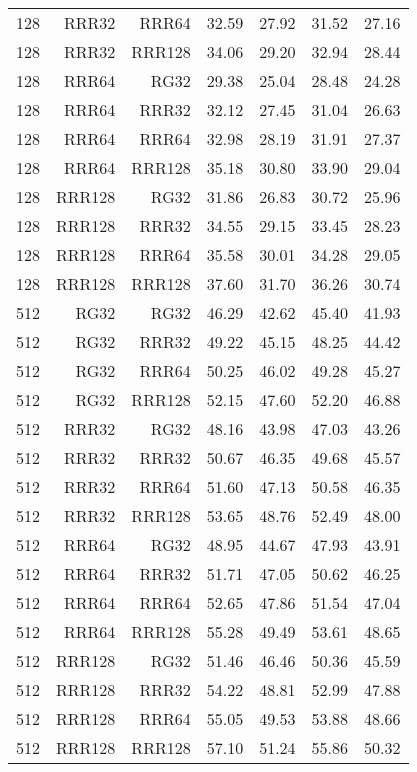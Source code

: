 \begin{table}
\begin{tabular}{|r|r|r|r|r|r|r|}
128 & RRR32 & RRR64 & 32.59 & 27.92 & 31.52 & 27.16 \\
128 & RRR32 & RRR128 & 34.06 & 29.20 & 32.94 & 28.44 \\
128 & RRR64 & RG32 & 29.38 & 25.04 & 28.48 & 24.28 \\
128 & RRR64 & RRR32 & 32.12 & 27.45 & 31.04 & 26.63 \\
128 & RRR64 & RRR64 & 32.98 & 28.19 & 31.91 & 27.37 \\
128 & RRR64 & RRR128 & 35.18 & 30.80 & 33.90 & 29.04 \\
128 & RRR128 & RG32 & 31.86 & 26.83 & 30.72 & 25.96 \\
128 & RRR128 & RRR32 & 34.55 & 29.15 & 33.45 & 28.23 \\
128 & RRR128 & RRR64 & 35.58 & 30.01 & 34.28 & 29.05 \\
128 & RRR128 & RRR128 & 37.60 & 31.70 & 36.26 & 30.74 \\
512 & RG32 & RG32 & 46.29 & 42.62 & 45.40 & 41.93 \\
512 & RG32 & RRR32 & 49.22 & 45.15 & 48.25 & 44.42 \\
512 & RG32 & RRR64 & 50.25 & 46.02 & 49.28 & 45.27 \\
512 & RG32 & RRR128 & 52.15 & 47.60 & 52.20 & 46.88 \\
512 & RRR32 & RG32 & 48.16 & 43.98 & 47.03 & 43.26 \\
512 & RRR32 & RRR32 & 50.67 & 46.35 & 49.68 & 45.57 \\
512 & RRR32 & RRR64 & 51.60 & 47.13 & 50.58 & 46.35 \\
512 & RRR32 & RRR128 & 53.65 & 48.76 & 52.49 & 48.00 \\
512 & RRR64 & RG32 & 48.95 & 44.67 & 47.93 & 43.91 \\
512 & RRR64 & RRR32 & 51.71 & 47.05 & 50.62 & 46.25 \\
512 & RRR64 & RRR64 & 52.65 & 47.86 & 51.54 & 47.04 \\
512 & RRR64 & RRR128 & 55.28 & 49.49 & 53.61 & 48.65 \\
512 & RRR128 & RG32 & 51.46 & 46.46 & 50.36 & 45.59 \\
512 & RRR128 & RRR32 & 54.22 & 48.81 & 52.99 & 47.88 \\
512 & RRR128 & RRR64 & 55.05 & 49.53 & 53.88 & 48.66 \\
512 & RRR128 & RRR128 & 57.10 & 51.24 & 55.86 & 50.32 \\
\hline
\end{tabular}
\end{table}